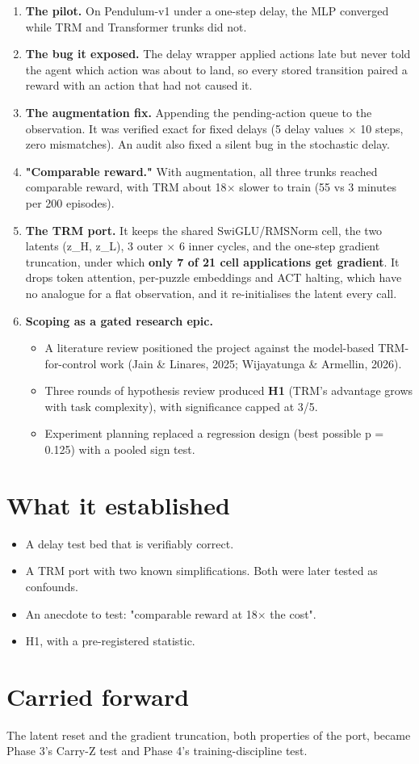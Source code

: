 \documentclass[11pt]{article}
\begin{document}
\begin{enumerate}
\item \textbf{The pilot.} On Pendulum-v1 under a one-step delay, the MLP converged while TRM and Transformer trunks did not.
\item \textbf{The bug it exposed.} The delay wrapper applied actions late but never told the agent which action was about to land, so every stored transition paired a reward with an action that had not caused it.
\item \textbf{The augmentation fix.} Appending the pending-action queue to the observation. It was verified exact for fixed delays (5 delay values $\times$ 10 steps, zero mismatches). An audit also fixed a silent bug in the stochastic delay.
\item \textbf{"Comparable reward."} With augmentation, all three trunks reached comparable reward, with TRM about 18$\times$ slower to train (55 vs 3 minutes per 200 episodes).
\item \textbf{The TRM port.} It keeps the shared SwiGLU/RMSNorm cell, the two latents (z\_H, z\_L), 3 outer $\times$ 6 inner cycles, and the one-step gradient truncation, under which \textbf{only 7 of 21 cell applications get gradient}. It drops token attention, per-puzzle embeddings and ACT halting, which have no analogue for a flat observation, and it re-initialises the latent every call.
\item \textbf{Scoping as a gated research epic.}
\begin{itemize}
\item A literature review positioned the project against the model-based TRM-for-control work (Jain \& Linares, 2025; Wijayatunga \& Armellin, 2026).
\item Three rounds of hypothesis review produced \textbf{H1} (TRM's advantage grows with task complexity), with significance capped at 3/5.
\item Experiment planning replaced a regression design (best possible p = 0.125) with a pooled sign test.
\end{itemize}
\end{enumerate}



\section*{What it established}



\begin{itemize}
\item A delay test bed that is verifiably correct.
\item A TRM port with two known simplifications. Both were later tested as confounds.
\item An anecdote to test: "comparable reward at 18$\times$ the cost".
\item H1, with a pre-registered statistic.
\end{itemize}



\section*{Carried forward}



The latent reset and the gradient truncation, both properties of the port, became Phase 3's Carry-Z test and Phase 4's training-discipline test.
\end{document}
